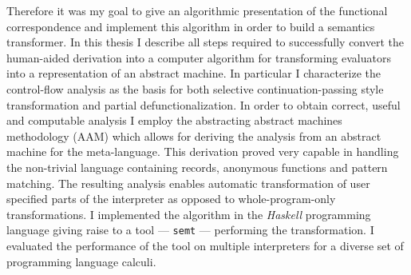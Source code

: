 Therefore it was my goal to give an algorithmic presentation of the functional correspondence and implement this algorithm in order to build a semantics transformer.
In this thesis I describe all steps required to successfully convert the human-aided derivation into a computer algorithm for transforming evaluators into a representation of an abstract machine.
In particular I characterize the control-flow analysis as the basis for both selective continuation-passing style transformation and partial defunctionalization.
In order to obtain correct, useful and computable analysis I employ the abstracting abstract machines methodology (AAM) \cite{aam} which allows for deriving the analysis from an abstract machine for the meta-language.
This derivation proved very capable in handling the non-trivial language containing records, anonymous functions and pattern matching.
The resulting analysis enables automatic transformation of user specified parts of the interpreter as opposed to whole-program-only transformations.
I implemented the algorithm in the \emph{Haskell} programming language giving raise to a tool --- \texttt{semt} --- performing the transformation.
I evaluated the performance of the tool on multiple interpreters for a diverse set of programming language calculi.

